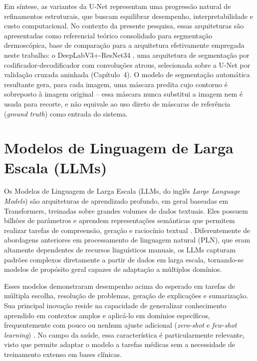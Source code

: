 Em síntese, as variantes da U-Net representam uma progressão natural de refinamentos estruturais, que buscam equilibrar desempenho, interpretabilidade e custo computacional. No contexto da presente pesquisa, essas arquiteturas são apresentadas como referencial teórico consolidado para segmentação dermoscópica, base de comparação para a arquitetura efetivamente empregada neste trabalho: o DeepLabV3+-ResNet34 \cite{chen2018deeplabv3plus,he2016resnet}, uma arquitetura de segmentação por codificador-decodificador com convoluções atrous, selecionada sobre a U-Net por validação cruzada aninhada (Capítulo~4). O modelo de segmentação automática resultante gera, para cada imagem, uma máscara predita cujo contorno é sobreposto à imagem original -- essa máscara nunca substitui a imagem nem é usada para recorte, e não equivale ao uso direto de máscaras de referência (\textit{ground truth}) como entrada do sistema.



\section{Modelos de Linguagem de Larga Escala (LLMs)}

Os Modelos de Linguagem de Larga Escala (LLMs, do inglês \textit{Large Language Models}) são arquiteturas de aprendizado profundo, em geral baseadas em Transformers, treinadas sobre grandes volumes de dados textuais. Eles possuem bilhões de parâmetros e aprendem representações semânticas que permitem realizar tarefas de compreensão, geração e raciocínio textual \cite{devlin2019bert,brown2020language}. Diferentemente de abordagens anteriores em processamento de linguagem natural (PLN), que eram altamente dependentes de recursos linguísticos manuais, os LLMs capturam padrões complexos diretamente a partir de dados em larga escala, tornando-se modelos de propósito geral capazes de adaptação a múltiplos domínios.

Esses modelos demonstraram desempenho acima do esperado em tarefas de múltipla escolha, resolução de problemas, geração de explicações e sumarização. Sua principal inovação reside na capacidade de generalizar conhecimento aprendido em contextos amplos e aplicá-lo em domínios específicos, frequentemente com pouco ou nenhum ajuste adicional (\textit{zero-shot} e \textit{few-shot learning}) \cite{openai2023gpt4}. No campo da saúde, essa característica é particularmente relevante, visto que permite adaptar o modelo a tarefas médicas sem a necessidade de treinamento extenso em bases clínicas.

